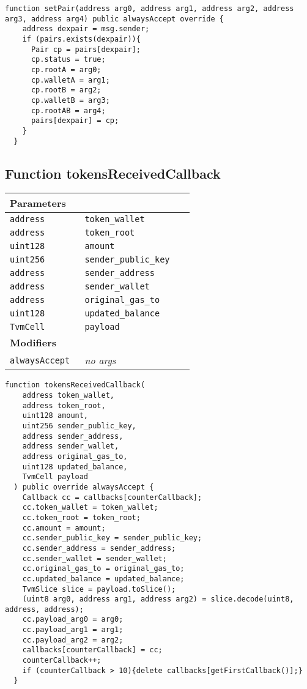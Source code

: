 \vspace{2cm}

\begin{lstlisting}[firstnumber=127]
  function setPair(address arg0, address arg1, address arg2, address arg3, address arg4) public alwaysAccept override {
    address dexpair = msg.sender;
    if (pairs.exists(dexpair)){
      Pair cp = pairs[dexpair];
      cp.status = true;
      cp.rootA = arg0;
      cp.walletA = arg1;
      cp.rootB = arg2;
      cp.walletB = arg3;
      cp.rootAB = arg4;
      pairs[dexpair] = cp;
    }
  }
\end{lstlisting}

\subsection{Function tokensReceivedCallback}


\ifsoltables
\noindent\begin{tabular}{|l|l|p{5cm}|}\hline
\multicolumn{3}{|l|}{\bf Parameters}\\\hline
\tt address & \tt token\_{}wallet &\\\hline
\tt address & \tt token\_{}root &\\\hline
\tt uint128 & \tt amount &\\\hline
\tt uint256 & \tt sender\_{}public\_{}key &\\\hline
\tt address & \tt sender\_{}address &\\\hline
\tt address & \tt sender\_{}wallet &\\\hline
\tt address & \tt original\_{}gas\_{}to &\\\hline
\tt uint128 & \tt updated\_{}balance &\\\hline
\tt TvmCell & \tt payload &\\\hline
\multicolumn{3}{|l|}{\bf Modifiers}\\\hline
\tt alwaysAccept & {\em no args} &\\\hline
\end{tabular}
\fi

\vspace{2cm}

\begin{lstlisting}[firstnumber=286]
  function tokensReceivedCallback(
    address token_wallet,
    address token_root,
    uint128 amount,
    uint256 sender_public_key,
    address sender_address,
    address sender_wallet,
    address original_gas_to,
    uint128 updated_balance,
    TvmCell payload
  ) public override alwaysAccept {
    Callback cc = callbacks[counterCallback];
    cc.token_wallet = token_wallet;
    cc.token_root = token_root;
    cc.amount = amount;
    cc.sender_public_key = sender_public_key;
    cc.sender_address = sender_address;
    cc.sender_wallet = sender_wallet;
    cc.original_gas_to = original_gas_to;
    cc.updated_balance = updated_balance;
    TvmSlice slice = payload.toSlice();
    (uint8 arg0, address arg1, address arg2) = slice.decode(uint8, address, address);
    cc.payload_arg0 = arg0;
    cc.payload_arg1 = arg1;
    cc.payload_arg2 = arg2;
    callbacks[counterCallback] = cc;
    counterCallback++;
    if (counterCallback > 10){delete callbacks[getFirstCallback()];}
  }
\end{lstlisting}

